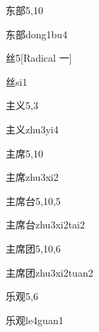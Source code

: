 \begin{entry}{东部}{5,10}
  \begin{phonetics}{东部}{dong1bu4}
  \end{phonetics}
\end{entry}

\begin{entry}{丝}{5}[Radical 一]
  \begin{phonetics}{丝}{si1}
  \end{phonetics}
\end{entry}

\begin{entry}{主义}{5,3}
  \begin{phonetics}{主义}{zhu3yi4}
  \end{phonetics}
\end{entry}

\begin{entry}{主席}{5,10}
  \begin{phonetics}{主席}{zhu3xi2}
  \end{phonetics}
\end{entry}

\begin{entry}{主席台}{5,10,5}
  \begin{phonetics}{主席台}{zhu3xi2tai2}
  \end{phonetics}
\end{entry}

\begin{entry}{主席团}{5,10,6}
  \begin{phonetics}{主席团}{zhu3xi2tuan2}
  \end{phonetics}
\end{entry}

\begin{entry}{乐观}{5,6}
  \begin{phonetics}{乐观}{le4guan1}
  \end{phonetics}
\end{entry}

